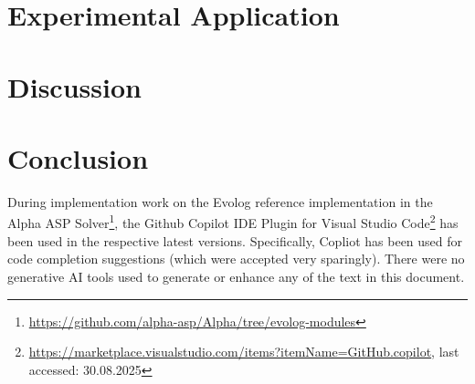 \documentclass[draft,final]{vutinfth} %
\theoremstyle{definition}
\begin{document}
\chapter{Experimental Application}
\label{chap:application-experiment}


\chapter{Discussion}
\label{chap:discussion}


\chapter{Conclusion}
\label{chap:conclusion}


\appendix


\backmatter

\begin{aitools}
During implementation work on the Evolog reference implementation in the Alpha ASP Solver\footnote{\url{https://github.com/alpha-asp/Alpha/tree/evolog-modules}}, the Github Copilot IDE Plugin for Visual Studio Code\footnote{\url{https://marketplace.visualstudio.com/items?itemName=GitHub.copilot}, last accessed: 30.08.2025} has been used in the respective latest versions. Specifically, Copliot has been used for code completion suggestions (which were accepted very sparingly). There were no generative AI tools used to generate or enhance any of the text in this document.
\end{aitools}

\listoffigures %

\cleardoublepage %
\listoftables %

\listofalgorithms
{}

\printindex

\printglossaries



\end{document}
